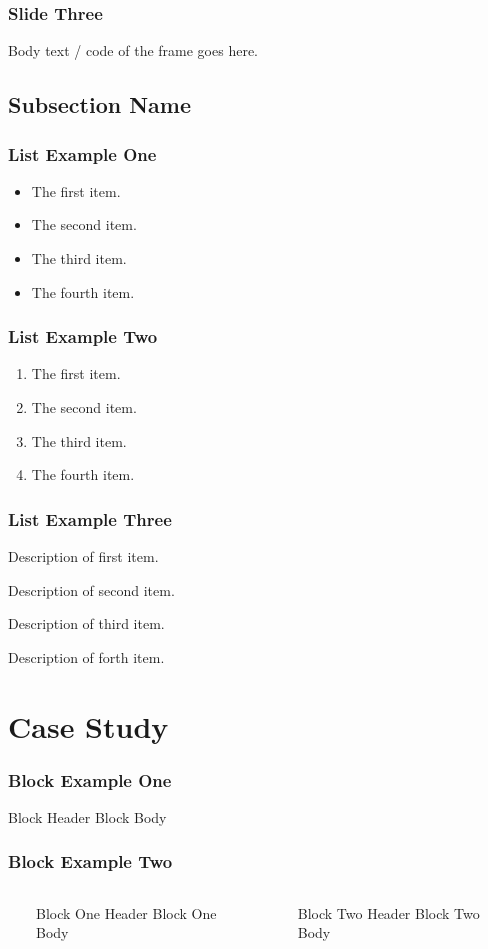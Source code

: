 \documentclass{beamer}
\begin{document}
\begin{frame}
\frametitle{Slide Three} 
Body text / code of the frame goes here. 
\end{frame} 


\subsection{Subsection Name}

\begin{frame}
\frametitle{List Example One}
\begin{itemize} 
\item The first item.
\item The second item.
\item The third item.
\item The fourth item.
\end{itemize}
\end{frame}

\begin{frame}
\frametitle{List Example Two}
\begin{enumerate} 
\item The first item.
\item The second item.
\item The third item.
\item The fourth item.
\end{enumerate}
\end{frame}

\begin{frame}
\frametitle{List Example Three}
\begin{description} 
\item[First Item] Description of first item.
\item[Second Item] Description of second item.
\item[Third Item] Description of third item.
\item[Forth Item] Description of forth item.
\end{description}
\end{frame}

\section{Case Study}
\begin{frame}
\frametitle{Block Example One}
\begin{block}{Block Header}
	Block Body
\end{block}
\end{frame}

\begin{frame}
\frametitle{Block Example Two}
\begin{columns}
  \ 
	\begin{block}{Block One Header} 
		Block One Body 
	\end{block} 
 \ 
	\begin{block}{Block Two Header} 
		Block Two Body
	\end{block} 
\end{columns}
\end{frame}
\end{document}
